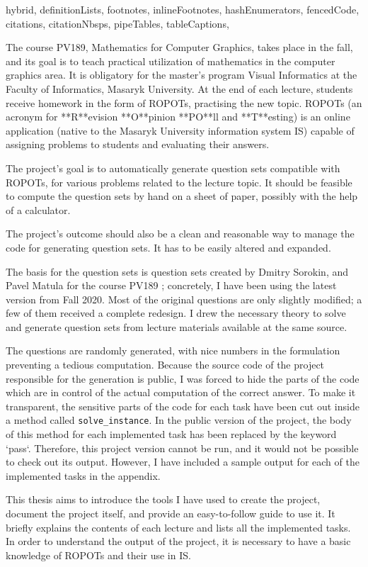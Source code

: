 \shorthandoff{-}
\begin{markdown*}{%
  hybrid,
  definitionLists,
  footnotes,
  inlineFootnotes,
  hashEnumerators,
  fencedCode,
  citations,
  citationNbsps,
  pipeTables,
  tableCaptions,
}

The course PV189, Mathematics for Computer Graphics, takes place in the fall, and its goal is to teach practical utilization of mathematics in the computer graphics area. It is obligatory for the master's program Visual Informatics at the Faculty of Informatics, Masaryk University. At the end of each lecture, students receive homework in the form of ROPOTs, practising the new topic. ROPOTs (an acronym for **R**evision **O**pinion **PO**ll and **T**esting) is an online application (native to the Masaryk University information system IS) capable of assigning problems to students and evaluating their answers.

The project's goal is to automatically generate question sets compatible with ROPOTs, for various problems related to the lecture topic. It should be feasible to compute the question sets by hand on a sheet of paper, possibly with the help of a calculator.  

The project's outcome should also be a clean and reasonable way to manage the code for generating question sets. It has to be easily altered and expanded. 

The basis for the question sets is question sets created by Dmitry Sorokin, and Pavel Matula for the course PV189 \cite{ucebni_materialy}; concretely, I have been using the latest version from Fall 2020. Most of the original questions are only slightly modified; a few of them received a complete redesign. I drew the necessary theory to solve and generate question sets from lecture materials available at the same source. 

The questions are randomly generated, with nice numbers in the formulation preventing a tedious computation. Because the source code of the project responsible for the generation is public, I was forced to hide the parts of the code which are in control of the actual computation of the correct answer. To make it transparent, the sensitive parts of the code for each task have been cut out inside a method called \verb|solve_instance|. In the public version of the project, the body of this method for each implemented task has been replaced by the keyword `pass`. Therefore, this project version cannot be run, and it would not be possible to check out its output. However, I have included a sample output for each of the implemented tasks in the appendix.

This thesis aims to introduce the tools I have used to create the project, document the project itself, and provide an easy-to-follow guide to use it. It briefly explains the contents of each lecture and lists all the implemented tasks. In order to understand the output of the project, it is necessary to have a basic knowledge of ROPOTs and their use in IS.   

\end{markdown*}
\shorthandon{-}